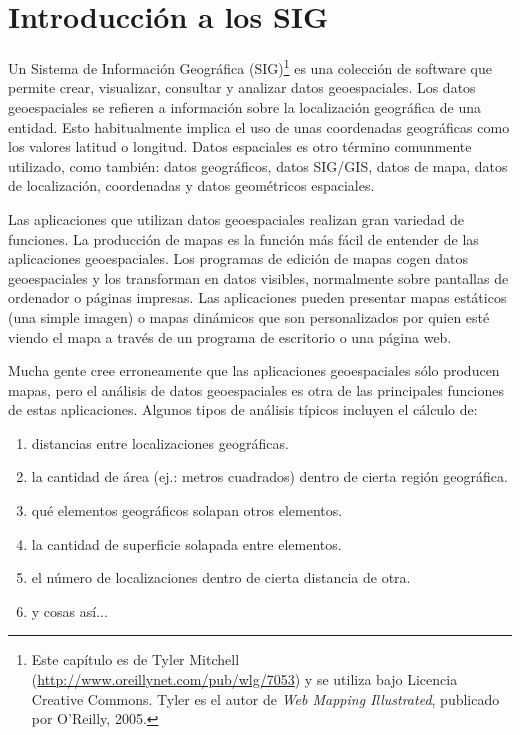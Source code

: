 
\section{Introducción a los SIG}\label{label_intro}


Un Sistema de Información Geográfica (SIG)\cite{mitchel05}\footnote{Este 
capítulo es de Tyler Mitchell (\url{http://www.oreillynet.com/pub/wlg/7053}) y 
se utiliza bajo Licencia Creative Commons. Tyler es el autor de 
\textit{Web Mapping Illustrated}, publicado por O'Reilly, 2005.}
es una colección de software que permite crear, visualizar, consultar y 
analizar datos geoespaciales. Los datos geoespaciales se refieren a 
información sobre la localización geográfica de una entidad. Esto 
habitualmente implica el uso de unas coordenadas geográficas como los valores 
latitud o longitud. Datos espaciales es otro término comunmente utilizado, como 
también: datos geográficos, datos SIG/GIS, datos de mapa, datos de localización, 
coordenadas y datos geométricos espaciales.

Las aplicaciones que utilizan datos geoespaciales realizan gran variedad de 
funciones. La producción de mapas es la función más fácil de entender de 
las aplicaciones geoespaciales. Los programas de edición de mapas cogen datos 
geoespaciales y los transforman en datos visibles, normalmente sobre pantallas
de ordenador o páginas impresas.
Las aplicaciones pueden presentar mapas estáticos (una simple imagen) o mapas
dinámicos que son personalizados por quien esté viendo el mapa a través de 
un programa de escritorio o una página web.

Mucha gente cree erroneamente que las aplicaciones geoespaciales sólo producen
mapas, pero el análisis de datos geoespaciales es otra de las principales 
funciones de estas aplicaciones. Algunos tipos de análisis típicos incluyen
el cálculo de:

\begin{enumerate}
\item distancias entre localizaciones geográficas.
\item la cantidad de área (ej.: metros cuadrados) dentro de cierta región
geográfica.
\item qué elementos geográficos solapan otros elementos.
\item la cantidad de superficie solapada entre elementos.
\item el número de localizaciones dentro de cierta distancia de otra.
\item y cosas así...
\end{enumerate}

